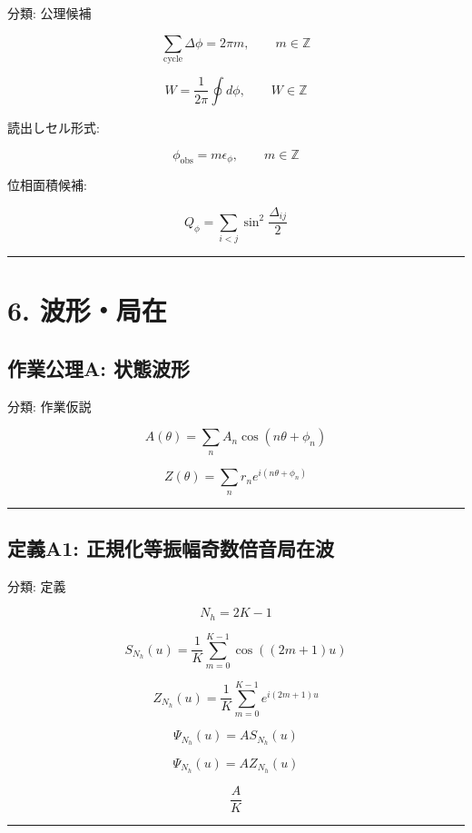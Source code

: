 \documentclass[
  a4paper,
]{ltjsarticle}
\begin{document}
分類: 公理候補

\[
\sum_{\mathrm{cycle}}\Delta\phi=2\pi m,\qquad m\in\mathbb{Z}
\]

\[
W=\frac{1}{2\pi}\oint d\phi,\qquad W\in\mathbb{Z}
\]

読出しセル形式:

\[
\phi_{\mathrm{obs}}=m\epsilon_\phi,\qquad m\in\mathbb{Z}
\]

位相面積候補:

\[
Q_\phi=\sum_{i<j}\sin^2\frac{\Delta_{ij}}{2}
\]

\begin{center}\rule{0.5\linewidth}{0.5pt}\end{center}

\section{6. 波形・局在}\label{ux6ce2ux5f62ux5c40ux5728}

\subsection{作業公理A:
状態波形}\label{ux4f5cux696dux516cux7406a-ux72b6ux614bux6ce2ux5f62}

分類: 作業仮説

\[
A(\theta)=\sum_n A_n\cos(n\theta+\phi_n)
\]

\[
Z(\theta)=\sum_n r_n e^{i(n\theta+\phi_n)}
\]

\begin{center}\rule{0.5\linewidth}{0.5pt}\end{center}

\subsection{定義A1:
正規化等振幅奇数倍音局在波}\label{ux5b9aux7fa9a1-ux6b63ux898fux5316ux7b49ux632fux5e45ux5947ux6570ux500dux97f3ux5c40ux5728ux6ce2}

分類: 定義

\[
N_h=2K-1
\]

\[
S_{N_h}(u)=\frac{1}{K}\sum_{m=0}^{K-1}\cos((2m+1)u)
\]

\[
Z_{N_h}(u)=\frac{1}{K}\sum_{m=0}^{K-1}e^{i(2m+1)u}
\]

\[
\Psi_{N_h}(u)=A S_{N_h}(u)
\]

\[
\Psi_{N_h}(u)=A Z_{N_h}(u)
\]

\[
\frac{A}{K}
\]

\begin{center}\rule{0.5\linewidth}{0.5pt}\end{center}
\end{document}
